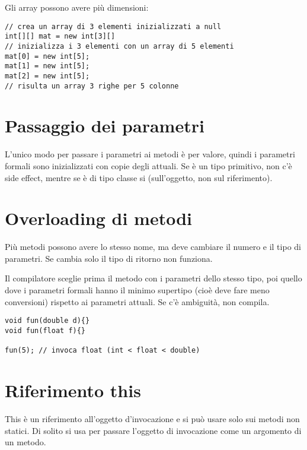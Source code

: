 Gli array possono avere più dimensioni:

\begin{lstlisting}
// crea un array di 3 elementi inizializzati a null
int[][] mat = new int[3][] 
// inizializza i 3 elementi con un array di 5 elementi
mat[0] = new int[5]; 
mat[1] = new int[5];
mat[2] = new int[5];
// risulta un array 3 righe per 5 colonne
\end{lstlisting}

\section{Passaggio dei parametri}
L'unico modo per passare i parametri ai metodi è per valore, quindi i parametri formali sono inizializzati con copie degli attuali. Se è un tipo primitivo, non c'è side effect, mentre se è di tipo classe si (sull'oggetto, non sul riferimento).

\section{Overloading di metodi}
Più metodi possono avere lo stesso nome, ma deve cambiare il numero e il tipo di parametri. Se cambia solo il tipo di ritorno non funziona.

Il compilatore sceglie prima il metodo con i parametri dello stesso tipo, poi quello dove i parametri formali hanno il minimo supertipo (cioè deve fare meno conversioni) rispetto ai parametri attuali.
Se c'è ambiguità, non compila.

\begin{lstlisting}
void fun(double d){}
void fun(float f){}

fun(5); // invoca float (int < float < double)
\end{lstlisting}

\section{Riferimento this}
This è un riferimento all'oggetto d'invocazione e si può usare solo sui metodi non statici. Di solito si usa per passare l'oggetto di
invocazione come un argomento di un metodo.

